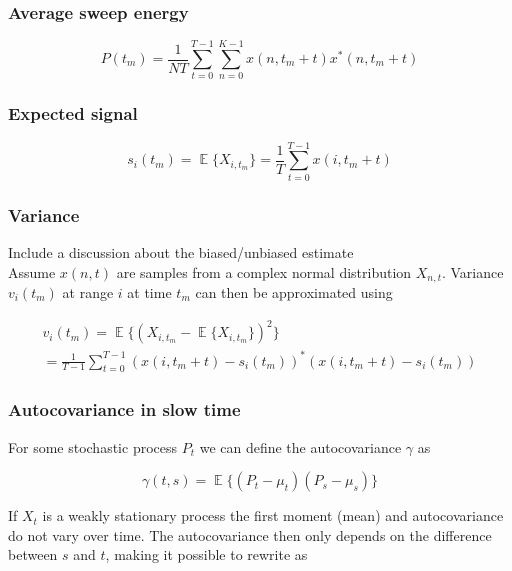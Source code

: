\documentclass[a4paper, 12pt]{article}
\DeclareMathOperator*{\E}{\mathbb{E}}
\begin{document}
\subsubsection{Average sweep energy}

\begin{equation}
	P(t_m) = \frac{1}{NT}\sum_{t=0}^{T-1}\sum_{n=0}^{K-1}x(n, t_m + t)x^*(n, t_m + t)
\end{equation}

\subsubsection{Expected signal}

\begin{equation}
	s_i(t_m) = \E\{X_{i,t_m}\} = \frac{1}{T}\sum_{t=0}^{T-1}x(i, t_m + t)
\end{equation}

\subsubsection{Variance}

Include a discussion about the biased/unbiased estimate \\

Assume $x(n,t)$ are samples from a complex normal distribution $X_{n,t}$. Variance $v_i(t_m)$ at range $i$ at time $t_m$ can then be approximated using

\begin{equation}
\label{eq:var}
\begin{gathered}
	v_i(t_m) = \E\{ (X_{i,t_m} - \E\{X_{i,t_m}\})^2\} \\
	= \frac{1}{T-1}\sum_{t=0}^{T-1}(x(i, t_m + t) - s_i(t_m))^*(x(i, t_m + t) -  s_i(t_m))
\end{gathered}
\end{equation}

\subsubsection{Autocovariance in slow time}

For some stochastic process $P_t$ we can define the autocovariance $\gamma$ as

\begin{equation}
	\gamma(t, s) = \E\big\{(P_t - \mu_t)(P_s - \mu_s)\big\}
\end{equation}

If $X_t$ is a weakly stationary process the first moment (mean) and autocovariance do not vary over time.  The autocovariance then only depends on the difference between $s$ and $t$, making it possible to rewrite as
\end{document}
